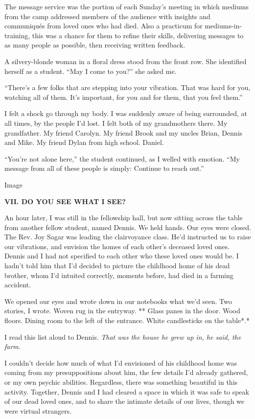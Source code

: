 The message service was the portion of each Sunday's meeting in which
mediums from the camp addressed members of the audience with insights
and communiqués from loved ones who had died. Also a practicum for
mediums-in-training, this was a chance for them to refine their skills,
delivering messages to as many people as possible, then receiving
written feedback.

A silvery-blonde woman in a floral dress stood from the front row. She
identified herself as a student. ``May I come to you?'' she asked me.

``There's a few folks that are stepping into your vibration. That was
hard for you, watching all of them. It's important, for you and for
them, that you feel them.''

I felt a shock go through my body. I was suddenly aware of being
surrounded, at all times, by the people I'd lost. I felt both of my
grandmothers there. My grandfather. My friend Carolyn. My friend Brook
and my uncles Brian, Dennis and Mike. My friend Dylan from high school.
Daniel.

``You're not alone here,'' the student continued, as I welled with
emotion. ``My message from all of these people is simply: Continue to
reach out.''

Image

\textbf{VII. DO YOU SEE WHAT I SEE?}

An hour later, I was still in the fellowship hall, but now sitting
across the table from another fellow student, named Dennis. We held
hands. Our eyes were closed. The Rev. Joy Sagar was leading the
clairvoyance class. He'd instructed us to raise our vibrations, and
envision the homes of each other's deceased loved ones. Dennis and I had
not specified to each other who these loved ones would be. I hadn't told
him that I'd decided to picture the childhood home of his dead brother,
whom I'd intuited correctly, moments before, had died in a farming
accident.

We opened our eyes and wrote down in our notebooks what we'd seen. Two
stories, I wrote. Woven rug in the entryway. ** Glass panes in the door.
Wood floors. Dining room to the left of the entrance. White candlesticks
on the table*.*

I read this list aloud to Dennis. \emph{That was the house he grew up
in, he said, the farm}.

I couldn't decide how much of what I'd envisioned of his childhood home
was coming from my presuppositions about him, the few details I'd
already gathered, or my own psychic abilities. Regardless, there was
something beautiful in this activity. Together, Dennis and I had cleared
a space in which it was safe to speak of our dead loved ones, and to
share the intimate details of our lives, though we were virtual
strangers.

